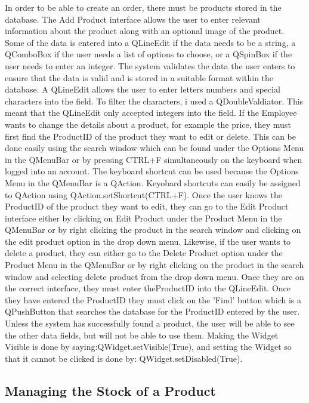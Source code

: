 In order to be able to create an order, there must be products stored in the database. The Add Product interface allows the user to enter relevant information about the product along with an optional image of the product. Some of the data is entered into a QLineEdit if the data needs to be a string, a QComboBox if the user needs a list of options to choose, or a QSpinBox if the user needs to enter an integer. The system validates the data the user enters to ensure that the data is valid and is stored in a suitable format within the database. A QLineEdit allows the user to enter letters numbers and special characters into the field. To filter the characters, i used a QDoubleValdiator. This meant that the QLineEdit only accepted integers into the field. If the Employee wants to change the details about a product, for example the price, they must first find the ProductID of the product they want to edit or delete. This can be done easily using the search window which can be found under the Options Menu in the QMenuBar or by pressing CTRL+F simultaneously on the keyboard when logged into an account. The keyboard shortcut can be used because the Options Menu in the QMenuBar is a QAction. Keyobard shortcuts can easily be assigned to QAction using QAction.setShortcut(CTRL+F). Once the user knows the ProductID of the product they want to edit, they can go to the Edit Product interface either by clicking on Edit Product under the Product Menu in the QMenuBar or by right clicking the product in the search window and clicking on the edit product option in the drop down menu. Likewise, if the user wants to delete a product, they can either go to the Delete Product option under the Product Menu in the QMenuBar or by right clicking on the product in the search window and selecting delete product from the drop down menu. Once they are on the correct interface, they must enter theProductID into the QLineEdit. Once they have entered the ProductID they must click on the 'Find' button which is a QPushButton that searches the database for the ProductID entered by the user. Unless the system has successfully found a product, the user will be able to see the other data fields, but will not be able to use them. Making the Widget Visible is done by saying:QWidget.setVisible(True), and setting the Widget so that it cannot be clicked is done by:  QWidget.setDisabled(True).

\subsection{Managing the Stock of a Product}

